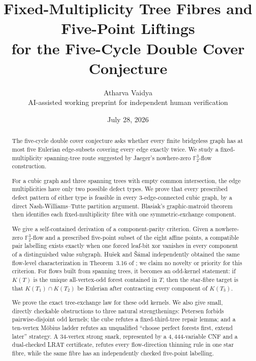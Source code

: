 \documentclass[11pt]{article}
\title{Fixed-Multiplicity Tree Fibres and Five-Point Liftings\\
for the Five-Cycle Double Cover Conjecture}
\author{Atharva Vaidya\\
\small AI-assisted working preprint for independent human verification}
\date{July 28, 2026}
\theoremstyle{definition}
\theoremstyle{remark}
\newcommand{\F}{\mathbb F}
\newcommand{\1}{\mathbf 1}
\begin{document}
\maketitle

\begin{center}
\end{center}

\begin{abstract}
The five-cycle double cover conjecture asks whether every finite bridgeless
graph has at most five Eulerian edge-subsets covering every edge exactly
twice.  We study a fixed-multiplicity spanning-tree route suggested by
Jaeger's nowhere-zero \(\F_2^3\)-flow construction.

For a cubic graph and three spanning trees with empty common intersection,
the edge multiplicities have only two possible defect types.  We prove that
every prescribed defect pattern of either type is feasible in every
3-edge-connected cubic graph, by a direct Nash-Williams--Tutte partition
argument.  Blasiak's graphic-matroid theorem then identifies each
fixed-multiplicity fibre with one symmetric-exchange component.

We give a self-contained derivation of a component-parity criterion.  Given
a nowhere-zero \(\F_2^3\)-flow and a prescribed five-point subset of the
eight affine points, a compatible pair labelling exists exactly when one
forced leaf-bit xor vanishes in every component of a distinguished value
subgraph.  Hu\v{s}ek and \v{S}\'amal independently obtained the same
flow-level characterization in Theorem~3.16 of
\cite{HusekSamal2026}; we claim no novelty or priority for this criterion.
For flows built from spanning trees, it becomes an odd-kernel statement:
if \(K(T)\) is the unique all-vertex-odd forest contained in \(T\), then the
star-fibre target is that \(K(T_1)\cap K(T_2)\) be Eulerian after contracting
every component of \(K(T_3)\).

We prove the exact tree-exchange law for these odd kernels.  We also give
small, directly checkable obstructions to three natural strengthenings:
Petersen forbids pairwise-disjoint odd kernels; the cube refutes a
fixed-third-tree repair lemma; and a ten-vertex M\"obius ladder refutes an
unqualified ``choose perfect forests first, extend later'' strategy.  A
34-vertex strong snark, represented by a \(4{,}444\)-variable CNF and a
dual-checked LRAT certificate, refutes every flow-direction thinning rule in
one star fibre, while the same fibre has an independently checked
five-point labelling.


\end{abstract}
\end{document}
